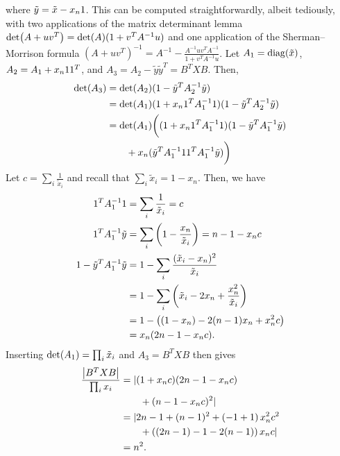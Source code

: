 where $\tilde{y} = \tilde{x} - x_{n} \mathrm{1}$.
This can be computed straightforwardly, albeit tediously, with two applications of the matrix determinant lemma $\Det{A + uv^T} = \Det{A} (1 + v^T A^{-1} u)$ and one application of the Sherman--Morrison formula $(A + uv^T)^{-1} = A^{-1} - \frac{A^{-1} u v^T A^{-1}}{1 + v^T A^{-1} u}$.
Let $A_1 = \Diag{\tilde{x}}$, $A_2 = A_1 + x_n \mathrm{1} \mathrm{1}^T$, and $A_3 = A_2 - \tilde{y} \tilde{y}^T = B^T X B$.
Then,
\begin{align*}
    \Det{A_3} & = \Det{A_2} (1 - \tilde{y}^T A_2^{-1} \tilde{y})                                       \\
              & = \Det{A_1} (1 + x_n \One^T A_1^{-1} \One) (1 - \tilde{y}^T A_2^{-1} \tilde{y})        \\
              & = \Det{A_1} \bigg( (1 + x_n \One^T A_1^{-1} \One) (1 - \tilde{y}^T A_1^{-1} \tilde{y}) \\
              & \qquad + x_n (\tilde{y}^T A_1^{-1} \One \One^T A_1^{-1} \tilde{y}) \bigg)
\end{align*}
Let $c = \sum_i \frac{1}{\tilde{x}_i}$ and recall that $\sum_i \tilde{x}_i = 1 - x_n$.
Then, we have
\begin{align*}
    \mathrm{1}^T A_1^{-1} \mathrm{1}               & = \sum_i \frac{1}{\tilde{x}_i} = c                                          \\
    \mathrm{1}^T A_1^{-1} \tilde{y}          & = \sum_i \left( 1 - \frac{x_n}{\tilde{x}_i} \right) = n - 1 - x_n c         \\
    1 - \tilde{y}^T A_1^{-1} \tilde{y} & = 1 - \sum_i \frac{(\tilde{x}_i - x_n)^2}{\tilde{x}_i}                      \\
                                       & = 1 - \sum_i \left( \tilde{x}_i - 2 x_n + \frac{x_n^2}{\tilde{x}_i} \right) \\
                                       & = 1 - \left( (1 - x_n) - 2 (n - 1) x_n + x_n^2 c \right)                    \\
                                       & = x_n (2n - 1 - x_n c).
\end{align*}
Inserting $\Det{A_1} = \prod_i \tilde{x}_i$ and $A_3 = B^T X B$ then gives
\begin{align*}
    \frac{\left\lvert B^T X B\right\rvert}{\prod_i x_i} & = | (1 + x_n c) (2n - 1 - x_n c)                       \\
                                         & \qquad + (n - 1 - x_n c)^2 |                           \\
                                         & = | 2n - 1 + (n-1)^2 + \left( -1 + 1 \right) x_n^2 c^2 \\
                                         & \qquad + \left( (2n - 1) - 1 - 2(n-1) \right) x_n c |  \\
                                         & = n^2.
\end{align*}

